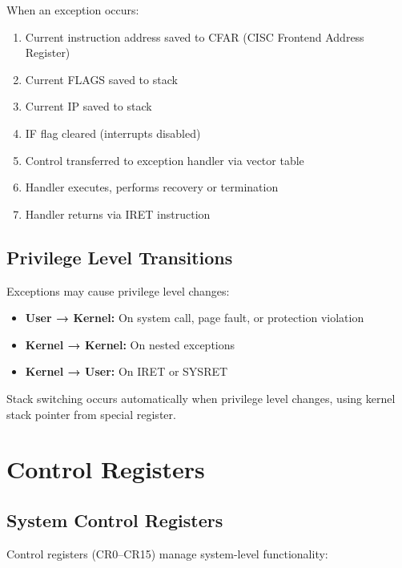 \documentclass[12pt]{article}
\begin{document}
When an exception occurs:

\begin{enumerate}
    \item Current instruction address saved to CFAR (CISC Frontend Address Register)
    \item Current FLAGS saved to stack
    \item Current IP saved to stack
    \item IF flag cleared (interrupts disabled)
    \item Control transferred to exception handler via vector table
    \item Handler executes, performs recovery or termination
    \item Handler returns via IRET instruction
\end{enumerate}

\subsection{Privilege Level Transitions}

Exceptions may cause privilege level changes:

\begin{itemize}
    \item \textbf{User → Kernel:} On system call, page fault, or protection violation
    \item \textbf{Kernel → Kernel:} On nested exceptions
    \item \textbf{Kernel → User:} On IRET or SYSRET
\end{itemize}

Stack switching occurs automatically when privilege level changes, using kernel stack pointer from special register.

\section{Control Registers}

\subsection{System Control Registers}

Control registers (CR0--CR15) manage system-level functionality:
\end{document}

